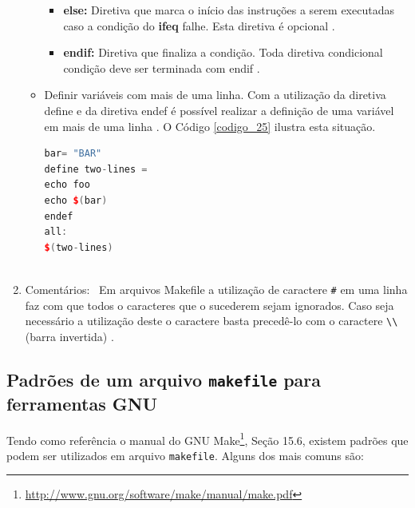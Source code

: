 \begin{enumerate}
\begin{itemize}
\begin{itemize}
        \item \textbf{else:} Diretiva que marca o início das instruções a serem 
    executadas caso a condição do \textbf{ifeq} falhe. Esta diretiva é opcional \cite[pág. 77]{ref45}.

        \item \textbf{endif:} Diretiva que finaliza a condição. 
    Toda diretiva condicional condição deve ser terminada com endif \cite[pág. 77]{ref45}.
    \end{itemize}

    \item Definir variáveis com mais de uma linha. Com a utilização da diretiva define
 e  da diretiva endef é possível realizar a definição de uma variável em mais
 de uma linha \cite[pág. 69]{ref45}. O Código \ref{codigo_25} ilustra esta situação.

    \begin{lstlisting}[language=C++,caption={
			 	Makefile com definição de variável em múltiplas linhas},
														label=codigo_25]
bar= "BAR"
define two-lines =
echo foo
echo $(bar)
endef
all:
$(two-lines)
    
    \end{lstlisting}


    \end{itemize}

    \item Comentários: \
Em arquivos Makefile a utilização de caractere \texttt{\#} em uma linha faz com
 que todos o caracteres que o sucederem sejam ignorados. Caso seja necessário
 a utilização deste o caractere basta precedê-lo com o caractere \texttt{\textbackslash\textbackslash} (barra invertida) \cite{ref45}.

\end{enumerate}


\subsection{Padrões de um arquivo \texttt{makefile} para ferramentas GNU}

    
Tendo como referência o manual do GNU Make\footnote{
\url{http://www.gnu.org/software/make/manual/make.pdf}},
Seção 15.6, existem padrões que podem ser utilizados em arquivo
 \texttt{makefile}. Alguns dos mais comuns são:

